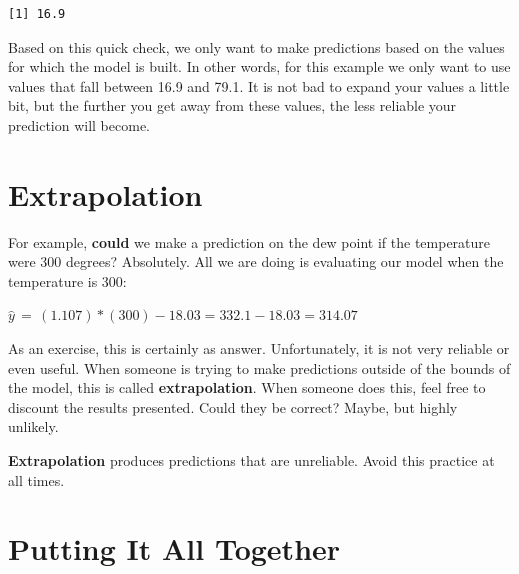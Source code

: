 \documentclass[
  letterpaper,
  DIV=11,
  numbers=noendperiod]{scrreprt}
\begin{document}
\begin{verbatim}
[1] 16.9
\end{verbatim}

Based on this quick check, we only want to make predictions based on the
values for which the model is built. In other words, for this example we
only want to use values that fall between 16.9 and 79.1. It is not bad
to expand your values a little bit, but the further you get away from
these values, the less reliable your prediction will become.

\section*{Extrapolation}\label{extrapolation}


For example, \textbf{could} we make a prediction on the dew point if the
temperature were 300 degrees? Absolutely. All we are doing is evaluating
our model when the temperature is 300:

\(\hat{y} \, = \, (1.107)*(300) - 18.03 = 332.1 - 18.03 = 314.07\)

As an exercise, this is certainly as answer. Unfortunately, it is not
very reliable or even useful. When someone is trying to make predictions
outside of the bounds of the model, this is called
\textbf{extrapolation}. When someone does this, feel free to discount
the results presented. Could they be correct? Maybe, but highly
unlikely.

\begin{tcolorbox}[enhanced jigsaw, toprule=.15mm, colbacktitle=quarto-callout-important-color!10!white, titlerule=0mm, arc=.35mm, breakable, opacityback=0, coltitle=black, opacitybacktitle=0.6, title=\textcolor{quarto-callout-important-color}{\faExclamation}\hspace{0.5em}{Important}, left=2mm, bottomtitle=1mm, colback=white, rightrule=.15mm, colframe=quarto-callout-important-color-frame, bottomrule=.15mm, toptitle=1mm, leftrule=.75mm]

\textbf{Extrapolation} produces predictions that are unreliable. Avoid
this practice at all times.

\end{tcolorbox}

\section*{Putting It All Together}\label{putting-it-all-together}
\end{document}
